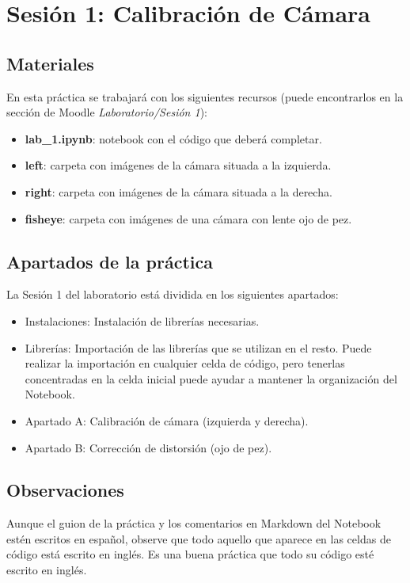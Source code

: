 \chapter{Sesión 1: Calibración de Cámara}
\label{chapter:introduction_ses_1}

\section{Materiales}
En esta práctica se trabajará con los siguientes recursos (puede encontrarlos en la sección de Moodle \textit{Laboratorio/Sesión 1}):

\begin{itemize}
    \item \textbf{lab\_1.ipynb}: notebook con el código que deberá completar.
    \item \textbf{left}: carpeta con imágenes de la cámara situada a la izquierda.
    \item \textbf{right}: carpeta con imágenes de la cámara situada a la derecha.
    \item \textbf{fisheye}: carpeta con imágenes de una cámara con lente ojo de pez.
\end{itemize}

\section{Apartados de la práctica}
La Sesión 1 del laboratorio está dividida en los siguientes apartados:

\begin{itemize}
    \item Instalaciones: Instalación de librerías necesarias.
    \item Librerías: Importación de las librerías que se utilizan en el resto. Puede realizar la importación en cualquier celda de código, pero tenerlas concentradas en la celda inicial puede ayudar a mantener la organización del Notebook.
    \item Apartado A: Calibración de cámara (izquierda y derecha).
    \item Apartado B:  Corrección de distorsión (ojo de pez).
\end{itemize}

\section{Observaciones}
Aunque el guion de la práctica y los comentarios en Markdown del Notebook estén escritos en español, observe que todo aquello que aparece en las celdas de código está escrito en inglés. Es una buena práctica que todo su código esté escrito en inglés.

